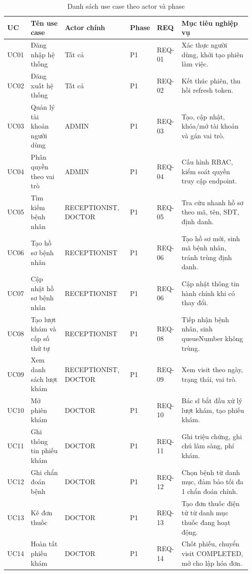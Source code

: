 \begin{longtable}{|p{1.3cm}|p{3.5cm}|p{2.5cm}|p{1.2cm}|p{1.2cm}|p{4.0cm}|}
\caption{Danh sách use case theo actor và phase}
\label{tab:srs-uc-list}\\
\hline
\textbf{UC} & \textbf{Tên use case} & \textbf{Actor chính} & \textbf{Phase} & \textbf{REQ} & \textbf{Mục tiêu nghiệp vụ} \\
\hline
\endhead
\hline
\endfoot
UC01 & Đăng nhập hệ thống & Tất cả & P1 & REQ-01 & Xác thực người dùng, khởi tạo phiên làm việc. \\
\hline
UC02 & Đăng xuất hệ thống & Tất cả & P1 & REQ-02 & Kết thúc phiên, thu hồi refresh token. \\
\hline
UC03 & Quản lý tài khoản người dùng & ADMIN & P1 & REQ-03 & Tạo, cập nhật, khóa/mở tài khoản và gán vai trò. \\
\hline
UC04 & Phân quyền theo vai trò & ADMIN & P1 & REQ-04 & Cấu hình RBAC, kiểm soát quyền truy cập endpoint. \\
\hline
UC05 & Tìm kiếm bệnh nhân & RECEPTIONIST, DOCTOR & P1 & REQ-05 & Tra cứu nhanh hồ sơ theo mã, tên, SĐT, định danh. \\
\hline
UC06 & Tạo hồ sơ bệnh nhân & RECEPTIONIST & P1 & REQ-06 & Tạo hồ sơ mới, sinh mã bệnh nhân, tránh trùng định danh. \\
\hline
UC07 & Cập nhật hồ sơ bệnh nhân & RECEPTIONIST & P1 & REQ-06 & Cập nhật thông tin hành chính khi có thay đổi. \\
\hline
UC08 & Tạo lượt khám và cấp số thứ tự & RECEPTIONIST & P1 & REQ-08 & Tiếp nhận bệnh nhân, sinh queueNumber không trùng. \\
\hline
UC09 & Xem danh sách lượt khám & RECEPTIONIST, DOCTOR & P1 & REQ-09 & Xem visit theo ngày, trạng thái, vai trò. \\
\hline
UC10 & Mở phiên khám & DOCTOR & P1 & REQ-10 & Bác sĩ bắt đầu xử lý lượt khám, tạo phiếu khám. \\
\hline
UC11 & Ghi thông tin phiếu khám & DOCTOR & P1 & REQ-11 & Ghi triệu chứng, ghi chú lâm sàng, phí khám. \\
\hline
UC12 & Ghi chẩn đoán bệnh & DOCTOR & P1 & REQ-12 & Chọn bệnh từ danh mục, đảm bảo tối đa 1 chẩn đoán chính. \\
\hline
UC13 & Kê đơn thuốc & DOCTOR & P1 & REQ-13 & Tạo đơn thuốc điện tử từ danh mục thuốc đang hoạt động. \\
\hline
UC14 & Hoàn tất phiếu khám & DOCTOR & P1 & REQ-14 & Chốt phiếu, chuyển visit COMPLETED, mở cho lập hóa đơn. \\

\end{longtable}
